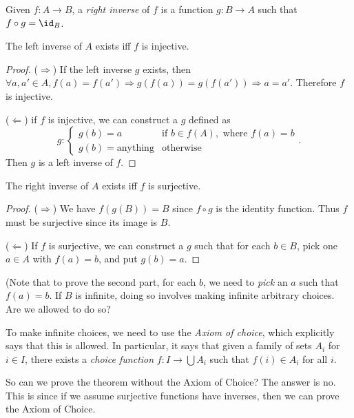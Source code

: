 \documentclass[a4paper]{article}
\begin{document}
\begin{defi}
  Given $f: A\to B$, a \emph{right inverse} of $f$ is a function $g:B\to A$ such that $f\circ g = \id _B$.
\end{defi}

\begin{thm}
  The left inverse of $A$ exists iff $f$ is injective.
\end{thm}

\begin{proof}
  ($\Rightarrow$)
  If the left inverse $g$ exists, then $\forall a, a'\in A, f(a) = f(a') \Rightarrow g( f(a))=g(f(a'))\Rightarrow a=a'$. Therefore $f$ is injective.

  ($\Leftarrow$) if $f$ is injective, we can construct a $g$ defined as
  \[
    g: \begin{cases}
      g(b) = a &\text{if }b\in f(A), \text{ where }f(a) = b\\
      g(b) = \text{anything} & \text{otherwise}
    \end{cases}.
  \]
  Then $g$ is a left inverse of $f$.
\end{proof}

\begin{thm}
  The right inverse of $A$ exists iff $f$ is surjective.
\end{thm}

\begin{proof}
  ($\Rightarrow$) We have $f(g(B)) = B$ since $f\circ g$ is the identity function. Thus $f$ must be surjective since its image is $B$.

  ($\Leftarrow$) If $f$ is surjective, we can construct a $g$ such that for each $b\in B$, pick one $a\in A$ with $f(a) = b$, and put $g(b) = a$.
\end{proof}

(Note that to prove the second part, for each $b$, we need to \emph{pick} an $a$ such that $f(a) = b$. If $B$ is infinite, doing so involves making infinite arbitrary choices. Are we allowed to do so?

To make infinite choices, we need to use the \emph{Axiom of choice}, which explicitly says that this is allowed. In particular, it says that given a family of sets $A_i$ for $i \in I$, there exists a \emph{choice function} $f: I \to \bigcup A_i$ such that $f(i)\in A_i$ for all $i$.

So can we prove the theorem without the Axiom of Choice? The answer is no. This is since if we assume surjective functions have inverses, then we can prove the Axiom of Choice.
\end{document}
